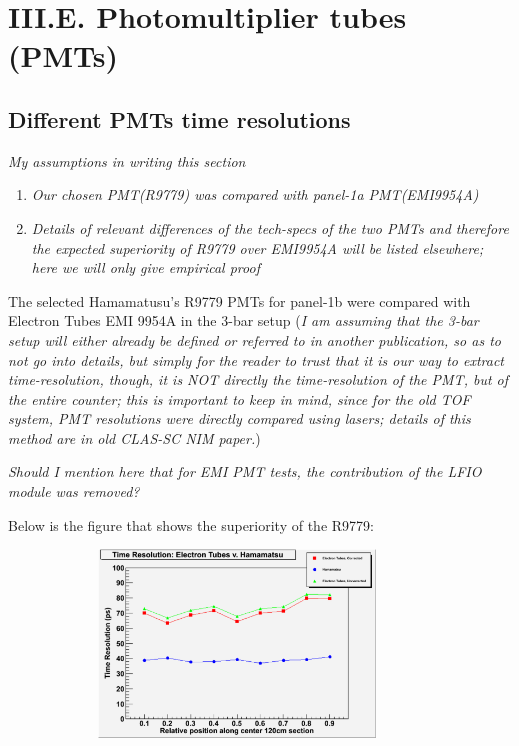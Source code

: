 \documentclass[12pt]{article}
\begin{document}
\maketitle


\section{III.E. Photomultiplier tubes (PMTs)}

\subsection{Different PMTs time resolutions}
\textit{My assumptions in writing this section}
\begin{enumerate}
	\item \textit{Our chosen PMT(R9779) was compared with panel-1a PMT(EMI9954A)}
	\item \textit {Details of relevant differences of the tech-specs of the two PMTs and therefore the expected superiority of R9779 over EMI9954A will be listed elsewhere; here we will only give empirical proof}
\end{enumerate}

The selected Hamamatusu's R9779 PMTs for panel-1b were compared with Electron Tubes EMI 9954A in the 3-bar setup (\textit{I am assuming that the 3-bar setup will either already be defined or referred to in another publication, so as to not go into details, but simply for the reader to trust that it is our way to extract time-resolution, though, it is NOT directly the time-resolution of the PMT, but of the entire counter; this is important to keep in mind, since for the old TOF system, PMT resolutions were directly compared using lasers; details of this method are in old CLAS-SC NIM paper.})

\textit{Should I mention here that for EMI PMT tests, the contribution of the LFIO module was removed?}

Below is the figure that shows the superiority of the R9779:
\begin{figure}[th]
	\includegraphics[width=10cm, height=5cm]{PMTcomparison.pdf}
\end{figure}
\end{document}
